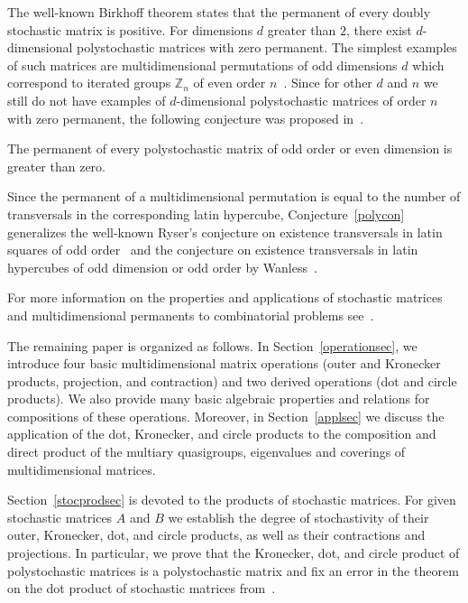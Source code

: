\documentclass[a4paper]{article}
\begin{document}
The well-known Birkhoff theorem states that the permanent of every doubly stochastic matrix is positive. For dimensions $d$ greater than $2$, there exist $d$-dimensional polystochastic matrices with zero permanent. The simplest examples of such matrices are multidimensional permutations of odd dimensions $d$ which correspond to iterated groups $\mathbb{Z}_n$ of even order $n$~\cite{wanless.surv}. Since for other $d$ and $n$ we still do not have examples of $d$-dimensional polystochastic matrices of order $n$ with zero permanent,  the following conjecture was proposed in~\cite{my.obzor}.

\begin{con} \label{polycon}
The permanent of every polystochastic matrix of odd order or even dimension is greater than zero.
\end{con}

Since the permanent of a multidimensional permutation is equal to the number of transversals in the corresponding latin hypercube, Conjecture~\ref{polycon} generalizes the well-known Ryser's conjecture on existence transversals in latin squares of odd order~\cite{ryser.conj} and the conjecture on existence transversals in latin hypercubes of odd dimension or odd order by Wanless~\cite{wanless.surv}.


For more information on the properties and applications of stochastic matrices and multidimensional permanents  to  combinatorial problems see~\cite{my.obzor, my.per44}. 

The remaining paper is organized as follows. In Section~\ref{operationsec}, we introduce four basic multidimensional matrix operations (outer and Kronecker products, projection, and contraction)  and two derived operations (dot and circle products).  We also provide many basic algebraic properties and relations for compositions of these operations.  Moreover, in Section~\ref{applsec} we discuss the application of the dot,  Kronecker, and circle products to the  composition and direct product  of the multiary quasigroups,  eigenvalues and coverings of multidimensional matrices.

Section~\ref{stocprodsec} is devoted to the products of stochastic matrices. For given stochastic matrices $A$ and $B$ we establish the degree of stochastivity of their outer, Kronecker, dot, and circle products, as well as their contractions and projections.  In particular, we prove that the Kronecker, dot, and circle product of polystochastic matrices is a polystochastic matrix and fix an error in the theorem on the dot product of stochastic matrices from~\cite{ChildWan.multper}.
\end{document}
